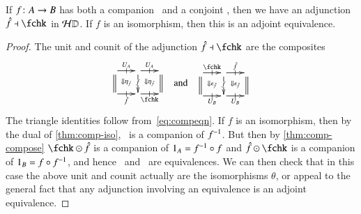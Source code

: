 \documentclass{amsart}
\begin{document}
\begin{lem}\label{thm:compconj-adj}
  If $f\colon A\to B$ has both a companion \fhat\ and a conjoint \fchk,
  then we have an adjunction $\fhat\adj\fchk$ in $\mathcal{H}\mathbb{D}$.  If $f$ is
  an isomorphism, then this is an adjoint equivalence.
\end{lem}
\begin{proof}
  The unit and counit of the adjunction $\fhat\adj\fchk$ are the
  composites
  \[\vcenter{\xymatrix@-.5pc{
      \ar[r]|-@{|}^{U_A}\ar@{=}[d] \ar@{}[dr]|{\Downarrow \eta_{\hat{f}}} &
      \ar[r]|-@{|}^{U_A}\ar[d]|{f} \ar@{}[dr]|{\Downarrow \eta_{\check{f}}} &
      \ar@{=}[d]\\
      \ar[r]|-@{|}_{\fhat} &
      \ar[r]|-@{|}_{\fchk} &
    }}\quad\text{and}\quad
  \vcenter{\xymatrix@-.5pc{
      \ar[r]|-@{|}^{\fchk}\ar@{=}[d] \ar@{}[dr]|{\Downarrow \epsilon_{\check{f}}} &
      \ar[r]|-@{|}^{\fhat}\ar[d]|{f} \ar@{}[dr]|{\Downarrow \epsilon_{\hat{f}}} &
      \ar@{=}[d]\\
      \ar[r]|-@{|}_{U_B} &
      \ar[r]|-@{|}_{U_B} &
    }}
  \]
  The triangle identities follow from~\eqref{eq:compeqn}.  If $f$ is
  an isomorphism, then by the dual of \autoref{thm:comp-iso}, \fchk\
  is a companion of $f^{-1}$.  But then by \autoref{thm:comp-compose}
  $\fchk\odot \fhat$ is a companion of $1_A=f^{-1} \circ f$ and
  $\fhat\odot\fchk$ is a companion of $1_B = f\circ f^{-1}$, and hence
  \fhat\ and \fchk\ are equivalences.  We can then check that in this
  case the above unit and counit actually are the isomorphisms
  $\theta$, or appeal to the general fact that any adjunction
  involving an equivalence is an adjoint equivalence.
\end{proof}
\end{document}
